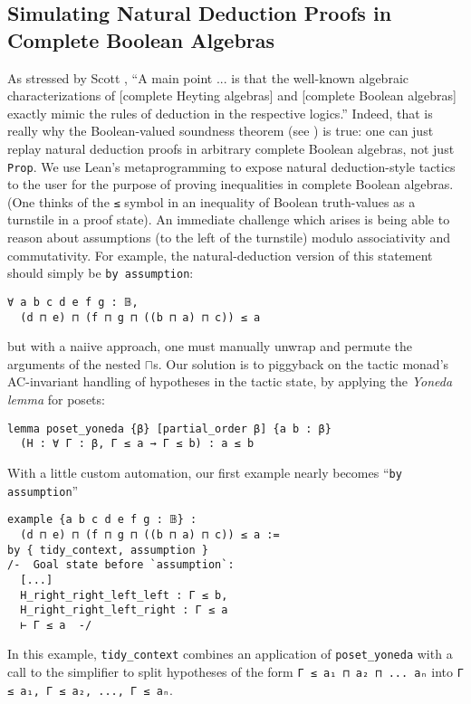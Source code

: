 \documentclass[sigplan,screen]{acmart}
\newcommand{\lil}{\lstinline}
\theoremstyle{definition}
\begin{document}
\subsection{Simulating Natural Deduction Proofs in Complete Boolean Algebras} \label{subsect:natded}
As stressed by Scott \cite{scott2008algebraic}, ``A main point ... is that the well-known algebraic characterizations of [complete Heyting algebras] and [complete Boolean algebras] exactly mimic the rules of deduction in the respective logics.''
Indeed, that is really why the Boolean-valued soundness theorem (see ) is true: one can just replay natural deduction proofs in arbitrary complete Boolean algebras, not just \lil{Prop}. We use Lean's metaprogramming to expose natural deduction-style tactics to the user for the purpose of proving inequalities in complete Boolean algebras. (One thinks of the \lil{≤} symbol in an inequality of Boolean truth-values as a turnstile in a proof state). An immediate challenge which arises is being able to reason about assumptions (to the left of the turnstile) modulo associativity and commutativity. For example, the natural-deduction version of this statement should simply be \lil{by assumption}:
\begin{lstlisting}
∀ a b c d e f g : 𝔹,
  (d ⊓ e) ⊓ (f ⊓ g ⊓ ((b ⊓ a) ⊓ c)) ≤ a
\end{lstlisting}
but with a naiive approach, one must manually unwrap and permute the arguments of the nested \(\sqcap\)s. Our solution is to piggyback on the tactic monad's AC-invariant handling of hypotheses in the tactic state, by applying the \emph{Yoneda lemma} for posets:
\label{poset-yoneda}
\begin{lstlisting}
lemma poset_yoneda {β} [partial_order β] {a b : β}
  (H : ∀ Γ : β, Γ ≤ a → Γ ≤ b) : a ≤ b
\end{lstlisting}
With a little custom automation, our first example nearly becomes ``\lil{by assumption}''
\begin{lstlisting}
example {a b c d e f g : 𝔹} :
  (d ⊓ e) ⊓ (f ⊓ g ⊓ ((b ⊓ a) ⊓ c)) ≤ a :=
by { tidy_context, assumption }
/-  Goal state before `assumption`:
  [...]
  H_right_right_left_left : Γ ≤ b,
  H_right_right_left_right : Γ ≤ a
  ⊢ Γ ≤ a  -/
\end{lstlisting}
In this example, \lil{tidy_context} combines an application of \lil{poset_yoneda} with a call to the simplifier to split hypotheses of the form \lstinline{Γ ≤ a₁ ⊓ a₂ ⊓ ... aₙ} into \lstinline{Γ ≤ a₁, Γ ≤ a₂, ..., Γ ≤ aₙ}.
\end{document}
